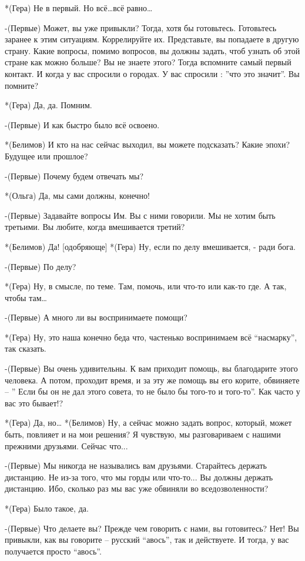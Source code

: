*(Гера) Не в первый.  Но всё…всё равно…

-(Первые) Может, вы уже привыкли? Тогда, хотя бы готовьтесь. Готовьтесь заранее к этим ситуациям. Коррелируйте их. Представьте, вы попадаете в другую страну. Какие вопросы, помимо вопросов, вы должны задать, чтоб узнать об этой стране как можно больше? Вы не знаете этого? Тогда вспомните самый первый контакт. И когда у вас спросили о городах. У вас спросили : ”что это значит”. Вы помните?

*(Гера) Да, да. Помним.

-(Первые) И как быстро было всё освоено.

*(Белимов) И кто на нас сейчас выходил, вы можете подсказать? Какие эпохи? Будущее или прошлое?

-(Первые) Почему будем отвечать мы?

*(Ольга)  Да, мы сами должны, конечно!

-(Первые) Задавайте вопросы Им. Вы с ними говорили. Мы не хотим быть третьими. Вы любите, когда вмешивается третий?

*(Белимов) Да! [одобряюще]
*(Гера) Ну, если по делу вмешивается, - ради бога.

-(Первые) По делу?

*(Гера) Ну, в смысле, по теме. Там, помочь, или что-то или как-то где. А так, чтобы там…

-(Первые) А много ли вы воспринимаете помощи?

*(Гера) Ну, это наша конечно беда что, частенько воспринимаем всё “насмарку”, так сказать.

-(Первые) Вы очень удивительны. К вам приходит помощь, вы благодарите этого человека. А потом, проходит время, и за эту же помощь вы его корите, обвиняете – ” Если бы он не дал этого совета, то не было бы того-то и того-то”. Как часто у вас это бывает!?

*(Гера) Да, но…
*(Белимов) Ну, а сейчас можно задать вопрос, который, может быть, повлияет и на мои решения?  Я чувствую, мы разговариваем с нашими прежними друзьями. Сейчас что...

-(Первые) Мы никогда не назывались вам друзьями. Старайтесь держать дистанцию. Не из-за того, что мы горды или что-то... Вы должны держать дистанцию. Ибо, сколько раз мы вас уже обвиняли во вседозволенности?

*(Гера) Было такое, да.

-(Первые) Что делаете вы? Прежде чем говорить с нами, вы готовитесь? Нет! Вы привыкли, как вы говорите  – русский “авось”, так и действуете. И тогда, у вас получается просто “авось”.

